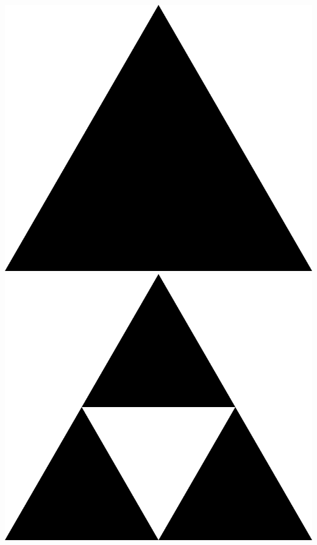 \documentclass[a4paper,ngerman]{scrartcl}
\begin{document}
\begin{itemize}
  \begin{center}
    \includegraphics[scale=0.1]{sierpinski-1}\hfill
    \includegraphics[scale=0.1]{sierpinski-2}\hfill

\end{center}
\end{itemize}
\end{document}
